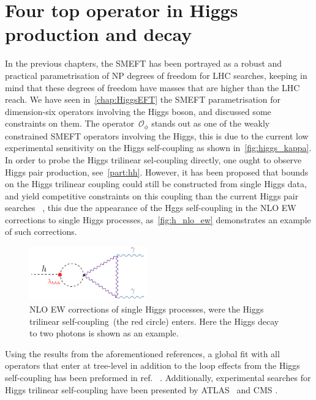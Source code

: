 

\chapter{ Four top operator in Higgs production and decay}\label{chap:4topSingleHiggs}
%
\par In the previous chapters, the SMEFT has been portrayed as  a robust and practical parametrisation of NP degrees of freedom for LHC searches, keeping in mind that these degrees of freedom have masses that are higher than the LHC reach. We have seen in~\autoref{chap:HiggsEFT} the SMEFT parametrisation for dimension-six operators involving the Higgs boson, and discussed some constraints on them. The operator~$ \mathcal O _{\phi}$ stands out as one of the weakly constrained SMEFT operators involving the Higgs, this is due to the current low experimental sensitivity on the Higgs self-coupling as shown in~\autoref{fig:higgs_kappa}. In order to probe the Higgs trilinear sel-coupling directly, one ought to observe Higgs pair production, see~\autoref{part:hh}. However, it has been proposed that bounds on the Higgs trilinear coupling could still be constructed from single Higgs data, and yield competitive constraints on this coupling than the current Higgs pair searches~ \cite{McCullough:2013rea, Gorbahn:2016uoy, Degrassi:2016wml, Bizon:2016wgr, Maltoni:2017ims, Degrassi:2019yix, Degrassi:2021uik, Haisch:2021hvy}, this due the appearance of the Hggs self-coupling in the NLO EW corrections to single Higgs processes, 
as~\autoref{fig:h_nlo_ew} demonstrates an example of such corrections.
\begin{figure}[htpb!]
	\begin{center}
		\includegraphics[width=0.45\textwidth]{figures/htoaa_nlo_ew}
		\caption{NLO EW corrections of single Higgs processes,  were the Higgs trilinear self-coupling~(the red circle) enters. Here the Higgs decay to two photons is shown as an example. \label{fig:h_nlo_ew} }
	\end{center}
\end{figure}
Using the results from the aforementioned references, a global fit with all operators that enter at tree-level in addition to the loop effects from the Higgs self-coupling has been preformed in ref.~ \cite{DiVita:2017eyz}. Additionally, experimental searches for Higgs trilinear self-coupling have been presented by ATLAS~\cite{ATLAS:2019pbo} and CMS \cite{CMS:2020gsy}.  
